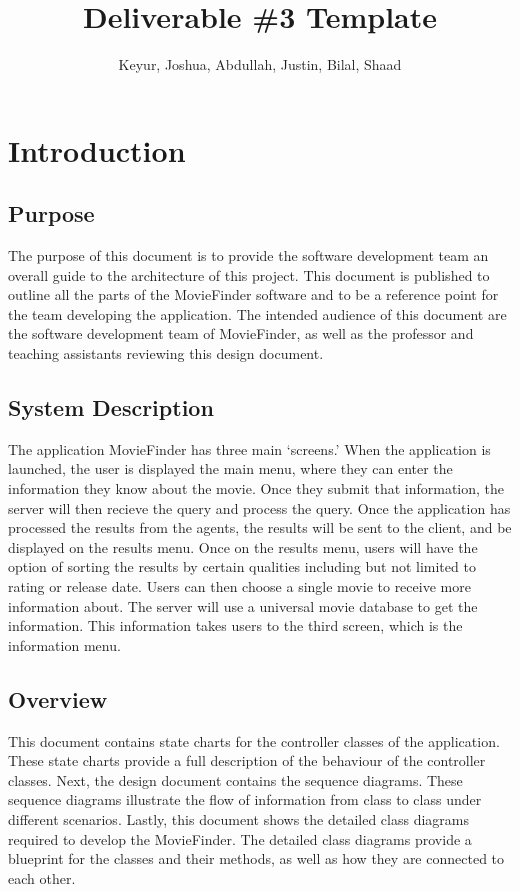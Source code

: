 \documentclass[]{article}
\title{Deliverable \#3 Template}
\author{Keyur, Joshua, Abdullah, Justin, Bilal, Shaad}
\date{}
\begin{document}
\maketitle	

\section{Introduction}
\label{sec:introduction}

\subsection{Purpose}
\label{sub:purpose}
The purpose of this document is to provide the software development team an overall guide to the architecture of this project. This document is published to outline all the parts of the MovieFinder software and to be a reference point for the team developing the application. The intended audience of this document are the software development team of MovieFinder, as well as  the professor and teaching assistants reviewing this design document.

\subsection{System Description}
\label{sub:system_description}
The application MovieFinder has three main `screens.' When the application is launched, the user is displayed the main menu, where they can enter the information they know about the movie. Once they submit that information, the server will then recieve the query and process the query. Once the application has processed the results from the agents, the results will be sent to the client, and be displayed on the results menu. Once on the results menu, users will have the option of sorting the results by certain qualities including but not limited to rating or release date. Users can then choose a single movie to receive more information about. The server will use a universal movie database to get the information. This information takes users to the third screen, which is the information menu.

\subsection{Overview}
\label{sub:overview}
This document contains state charts for the controller classes of the application. These state charts provide a full description of the behaviour of the controller classes. Next, the design document contains the sequence diagrams. These sequence diagrams illustrate the flow of information from class to class under different scenarios. Lastly, this document shows the detailed class diagrams required to develop the MovieFinder. The detailed class diagrams provide a blueprint for the classes and their methods, as well as how they are connected to each other.
\end{document}
